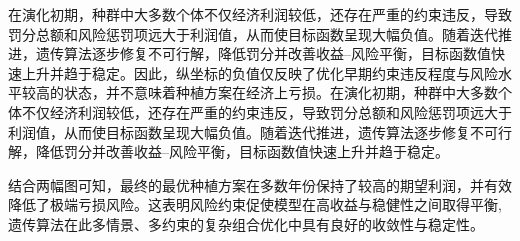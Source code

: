 在演化初期，种群中大多数个体不仅经济利润较低，还存在严重的约束违反，导致罚分总额和风险惩罚项远大于利润值，从而使目标函数呈现大幅负值。随着迭代推进，遗传算法逐步修复不可行解，降低罚分并改善收益--风险平衡，目标函数值快速上升并趋于稳定。因此，纵坐标的负值仅反映了优化早期约束违反程度与风险水平较高的状态，并不意味着种植方案在经济上亏损。在演化初期，种群中大多数个体不仅经济利润较低，还存在严重的约束违反，导致罚分总额和风险惩罚项远大于利润值，从而使目标函数呈现大幅负值。随着迭代推进，遗传算法逐步修复不可行解，降低罚分并改善收益--风险平衡，目标函数值快速上升并趋于稳定。

结合两幅图可知，最终的最优种植方案在多数年份保持了较高的期望利润，并有效降低了极端亏损风险。这表明风险约束促使模型在高收益与稳健性之间取得平衡,遗传算法在此多情景、多约束的复杂组合优化中具有良好的收敛性与稳定性。

